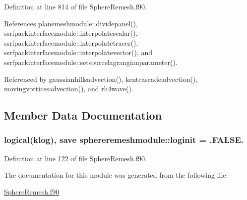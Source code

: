 Definition at line 814 of file Sphere\+Remesh.\+f90.



References planemeshmodule\+::dividepanel(), ssrfpackinterfacemodule\+::interpolatescalar(), ssrfpackinterfacemodule\+::interpolatetracer(), ssrfpackinterfacemodule\+::interpolatevector(), and ssrfpackinterfacemodule\+::setsourcelagrangianparameter().



Referenced by gaussianhillsadvection(), kentcascadeadvection(), movingvorticesadvection(), and rh4wave().



\subsection{Member Data Documentation}
\hypertarget{classsphereremeshmodule_abb7d03fe481567ce717c9eab0fd37dc1}{
\subsubsection[{loginit}]{\setlength{\rightskip}{0pt plus 5cm}logical(klog), save sphereremeshmodule\+::loginit = .F\+A\+L\+S\+E.}}\label{classsphereremeshmodule_abb7d03fe481567ce717c9eab0fd37dc1}


Definition at line 122 of file Sphere\+Remesh.\+f90.



The documentation for this module was generated from the following file\+:\begin{DoxyCompactItemize}
\item 
\hyperlink{SphereRemesh_8f90}{Sphere\+Remesh.\+f90}\end{DoxyCompactItemize}
